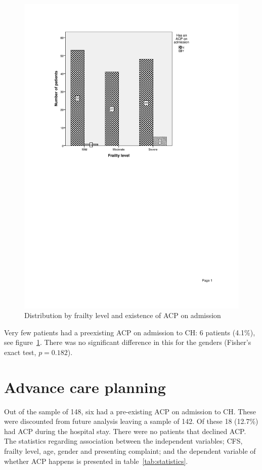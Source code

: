 \documentclass
[
	12pt,
	a4paper,
	oneside,
]{report}
\begin{document}
\begin{figure}[ht]
\caption{Distribution by frailty level and existence of ACP on admission}
\label{fig:chart-dist-frailty-level}
\includegraphics[width=\textwidth,
	trim={2.5cm 14cm 2.5cm 2.5cm},
	clip]{media/chart-dist-frailty-level}
\end{figure}

Very few patients had a preexisting ACP on admission to CH: 6
patients (4.1\%), see figure~\ref{fig:chart-dist-frailty-level}. There was no 
significant difference in this for the genders (Fisher's exact test, $p=0.182$).

\section{Advance care planning}

Out of the sample of 148, six had a pre-existing ACP on admission to CH. These 
were discounted from future analysis leaving a sample of 142. Of these 18 
(12.7\%) had ACP during the hospital stay. There were no patients that 
declined ACP. The statistics regarding association between the independent 
variables; CFS, frailty level, age, gender and presenting complaint; and the 
dependent variable of whether ACP happens is presented in 
table~\ref{tab:statistics}.
\end{document}
